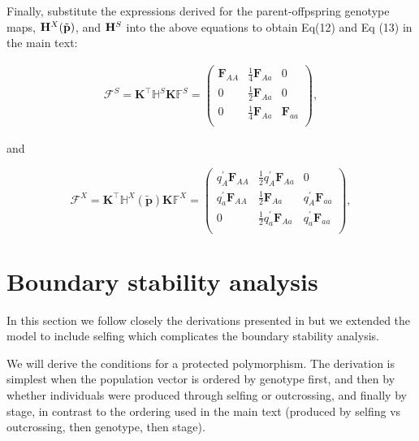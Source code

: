 \documentclass[11pt]{article}
\def\mbf#1{\mathbf{#1}}
\def\mbb#1{\mathbb{#1}}
\def\mcal#1{\mathcal{#1}}
\newcommand{\bo}[1]{{\bf #1}}
\begin{document}
Finally, substitute the expressions derived for the parent-offpspring genotype maps, $\bo H^X(\tilde{\mbf{p}}) $, and $\bo H^S$ into the above equations to obtain Eq(12) and Eq (13) in the main text:
\begin{linenomath*}
\begin{eqnarray}
	\mcal{F}^S = \mbf{K}^{\intercal} \mbb{H}^S\mbf{K} \mbb{F}^S = 
			\left(
			\begin{array}{ccc}
				\mbf{F}_{AA} & \frac{1}{4} \mbf{F}_{Aa} & 0 \\
				0 & \frac{1}{2} \mbf{F}_{Aa} & 0 \\
				0 & \frac{1}{4} \mbf{F}_{Aa} & \mbf{F}_{aa}\\
			\end{array} \right),  \label{eq:BlkFS_appendix}
\end{eqnarray}
\end{linenomath*}
\noindent and 
\begin{linenomath*}
\begin{equation} \label{eq:BlkFX_appendix}
	\mcal{F}^X = \mbf{K}^{\intercal} \mbb{H}^X(\tilde{\mbf{p}}) \mbf{K} \mbb{F}^X = 
			\left(
			\begin{array}{ccc}
				q^{\prime}_{A} \mbf{F}_{AA} & \frac{1}{2} q^{\prime}_{A} \mbf{F}_{Aa} & 0 \\ 
				q^{\prime}_{a} \mbf{F}_{AA} & \frac{1}{2} \mbf{F}_{Aa} & q^{\prime}_{A} \mbf{F}_{aa}  \\ 
				0 & \frac{1}{2} q^{\prime}_{a} \mbf{F}_{Aa} & q^{\prime}_{a} \mbf{F}_{aa}  \\
			\end{array} \right),
\end{equation}
\end{linenomath*}
\newpage

\section{Boundary stability analysis}

In this section we follow closely the derivations presented in \cite{deVriesCaswell2019a} but we extended the model to include selfing which complicates the boundary stability analysis. 

We will derive the conditions for a protected polymorphism. The derivation is simplest when the population vector is ordered by genotype first, and then by whether individuals were produced through selfing or outcrossing, and finally by stage, in contrast to the ordering used in the main text (produced by selfing vs outcrossing, then genotype, then stage). 
\end{document}

